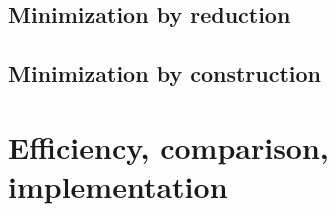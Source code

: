 \documentclass[a4paper]{report}
\begin{document}
\section{Minimization by reduction}










\section{Minimization by construction}








\chapter{Efficiency, comparison, implementation}






	
\end{document}
